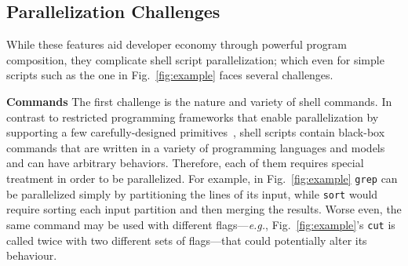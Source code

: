 \documentclass[letterpaper,twocolumn,10pt]{article}
\newcommand{\eg}{{\em e.g.}, }
\newcommand{\heading}[1]{\vspace{4pt}\noindent\textbf{#1}\enspace}
\newcommand{\ttt}[1]{\texttt{#1}}
\begin{document}



\subsection{Parallelization Challenges}
\label{bg:challenges}

While these features aid developer economy through powerful program
composition, they complicate shell script parallelization; which even
for simple scripts such as the one in Fig.~\ref{fig:example} faces
several challenges.

\heading{Commands} %
The first challenge is the nature and variety of shell commands.
In contrast to restricted programming frameworks that enable
parallelization by supporting a few carefully-designed primitives~\cite{streamit:02, brook:04, mapreduce:08, spark:12}, shell scripts contain black-box commands that are written in a variety of programming languages and models and can have arbitrary behaviors.
Therefore, each of them requires special treatment in order to be parallelized.
For example, in Fig.~\ref{fig:example}
\ttt{grep} can be parallelized simply by partitioning the lines of its input, while \ttt{sort} would require sorting each input partition and then merging the results.
Worse even, the same command may be used with different flags---\eg Fig.~\ref{fig:example}'s \ttt{cut} is called twice with two different sets of flags---that could potentially alter its behaviour. %
\end{document}
